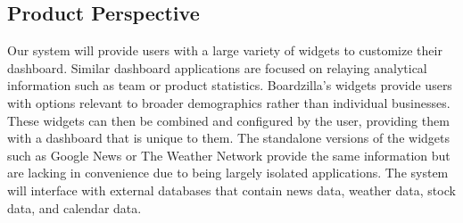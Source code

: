 \documentclass[]{article}
\begin{document}
	\subsection{Product Perspective}
	\label{sub:product_perspective}
	Our system will provide users with a large variety of widgets to customize their dashboard. Similar dashboard applications are focused on relaying analytical information such as team or product statistics. Boardzilla's widgets provide users with options relevant to broader demographics rather than individual businesses. These widgets can then be combined and configured by the user, providing them with a dashboard that is unique to them. The standalone versions of the widgets such as Google News or The Weather Network provide the same information but are lacking in convenience due to being largely isolated applications. The system will interface with external databases that contain news data, weather data, stock data, and calendar data. %
		
	
	
\end{document}

